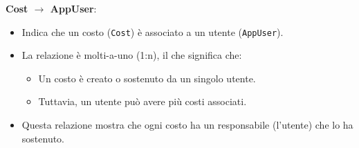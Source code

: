 \textbf{Cost $\rightarrow$ AppUser}: \begin{itemize} \item Indica che un costo (\texttt{Cost}) è associato a un utente (\texttt{AppUser}). \item La relazione è molti-a-uno (1:n), il che significa che: \begin{itemize} \item Un costo è creato o sostenuto da un singolo utente. \item Tuttavia, un utente può avere più costi associati. \end{itemize} \item Questa relazione mostra che ogni costo ha un responsabile (l'utente) che lo ha sostenuto. \end{itemize}




